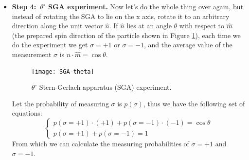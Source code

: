 \documentclass{easyclass}
\begin{document}
\begin{itemize}
	\item \textbf{Step 4:\ $\theta^{\circ}$ SGA experiment.} Now let’s do the whole thing over again, but instead of rotating the SGA to lie on the x axis, rotate it to an arbitrary
	direction along the unit vector $\hat{n}$. If $\hat{n}$ lies at an angle $\theta$ with respect to $\hat{m}$ (the prepared spin direction of the particle shown in Figure \ref{fig:SGA-theta}), each time we do the experiment we get $\sigma = +1$ or $\sigma = −1$, and the average value of the measurement $\sigma$ is $\hat{n}\cdot\hat{m}=\cos\theta$. 
	
	\begin{figure}[h]
		\centering
		\texttt{[image: SGA-theta]}
		\caption{$\theta^{\circ}$ Stern-Gerlach apparatus (SGA) experiment.}
		\label{fig:SGA-theta}
	\end{figure}

	Let the probability of measuring $\sigma$ is $p(\sigma)$, thus we have the following set of equations:
	\begin{equation}
		\begin{cases}
			p(\sigma=+1)\cdot(+1)+p(\sigma=-1)\cdot(-1)=\cos\theta\\
			p(\sigma=+1)+p(\sigma=-1)=1
		\end{cases}
	\end{equation}
	From which we can calculate the measuring probabilities of $\sigma = +1$ and $\sigma = -1$.
	
\end{itemize}
\end{document}
